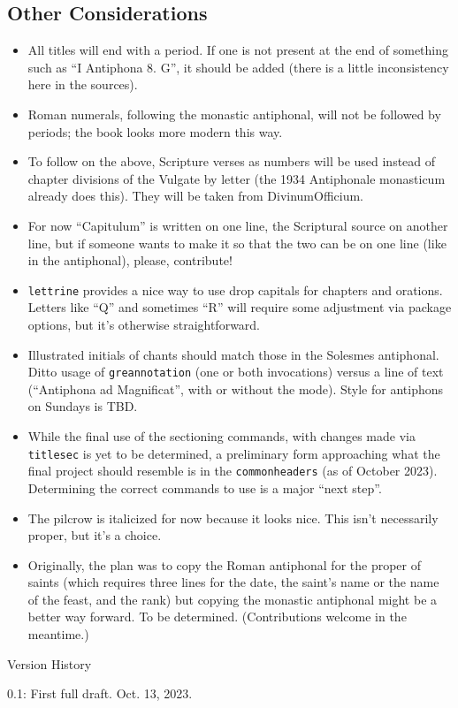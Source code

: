 \documentclass[11pt]{article}
\begin{document}
\subsection{Other Considerations}
\begin{itemize}
\item
All titles will end with a period. If one is not present at the end of something such as ``I Antiphona 8. G'', it should be added (there is a little inconsistency here in the sources).
\item
Roman numerals, following the monastic antiphonal, will not be followed by periods; the book looks more modern this way.
\item
To follow on the above, Scripture verses as numbers will be used instead of chapter divisions of the Vulgate by letter (the 1934 Antiphonale monasticum already does this). They will be taken from DivinumOfficium.
\item
For now ``Capitulum'' is written on one line, the Scriptural source on another line, but if someone wants to make it so that the two can be on one line (like in the antiphonal), please, contribute!
\item
\verb|lettrine| provides a nice way to use drop capitals for chapters and orations. Letters like ``Q'' and sometimes ``R'' will require some adjustment via package options, but it's otherwise straightforward.
\item
Illustrated initials of chants should match those in the Solesmes antiphonal. Ditto usage of \verb|greannotation| (one or both invocations) versus a line of text (``Antiphona ad Magnificat'', with or without the mode). Style for antiphons on Sundays is TBD.
\item While the final use of the sectioning commands, with changes made via \verb|titlesec| is yet to be determined, a preliminary form approaching what the final project should resemble is in the \verb|commonheaders| (as of October 2023). Determining the correct commands to use is a major ``next step''.
\item
The pilcrow is italicized for now because it looks nice. This isn't necessarily proper, but it's a choice.
\item
Originally, the plan was to copy the Roman antiphonal for the proper of saints (which requires three lines for the date, the saint's name or the name of the feast, and the rank) but copying the monastic antiphonal might be a better way forward. To be determined. (Contributions welcome in the meantime.)

\end{itemize}

Version History

0.1: First full draft. Oct. 13, 2023.
\end{document}
